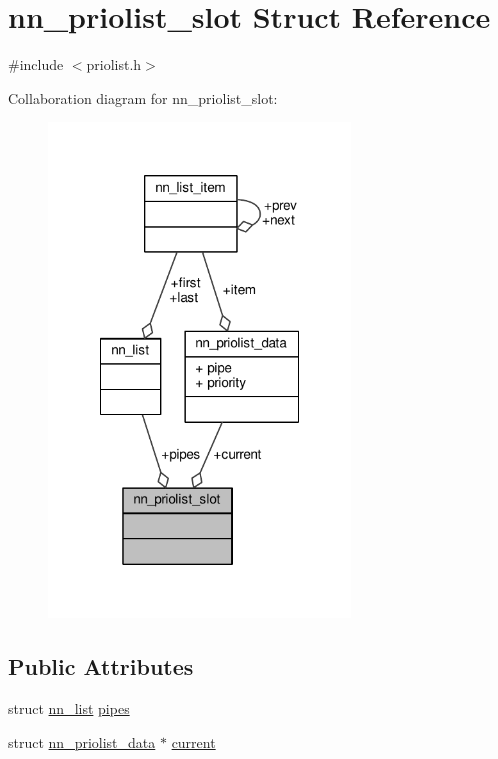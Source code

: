 \hypertarget{structnn__priolist__slot}{}\section{nn\+\_\+priolist\+\_\+slot Struct Reference}
\label{structnn__priolist__slot}


{\ttfamily \#include $<$priolist.\+h$>$}



Collaboration diagram for nn\+\_\+priolist\+\_\+slot\+:\nopagebreak
\begin{figure}[H]
\begin{center}
\leavevmode
\includegraphics[width=227pt]{structnn__priolist__slot__coll__graph}
\end{center}
\end{figure}
\subsection*{Public Attributes}
\begin{DoxyCompactItemize}
\item 
struct \hyperlink{structnn__list}{nn\+\_\+list} \hyperlink{structnn__priolist__slot_a6bbb571b29ea6f12d11cb1ef2cf24fde}{pipes}
\item 
struct \hyperlink{structnn__priolist__data}{nn\+\_\+priolist\+\_\+data} $\ast$ \hyperlink{structnn__priolist__slot_a8edde8ff839385d6f374db37f20dbafe}{current}
\end{DoxyCompactItemize}


